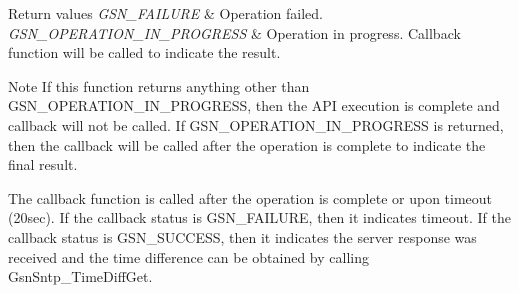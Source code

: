 \begin{DoxyRetVals}{Return values}
{\em GSN\_\-FAILURE} & Operation failed. \\
\hline
{\em GSN\_\-OPERATION\_\-IN\_\-PROGRESS} & Operation in progress. Callback function will be called to indicate the result. \\
\hline
\end{DoxyRetVals}
\begin{DoxyNote}{Note}
If this function returns anything other than GSN\_\-OPERATION\_\-IN\_\-PROGRESS, then the API execution is complete and callback will not be called. If GSN\_\-OPERATION\_\-IN\_\-PROGRESS is returned, then the callback will be called after the operation is complete to indicate the final result. 

The callback function is called after the operation is complete or upon timeout (20sec). If the callback status is GSN\_\-FAILURE, then it indicates timeout. If the callback status is GSN\_\-SUCCESS, then it indicates the server response was received and the time difference can be obtained by calling GsnSntp\_\-TimeDiffGet. 
\end{DoxyNote}
